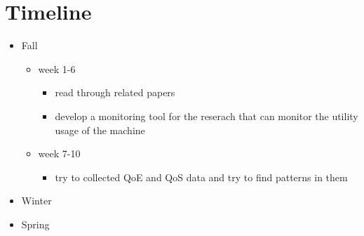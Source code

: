 \section{Timeline}\label{timeline}
\begin{itemize}
    \item Fall
    \begin{itemize}
        \item week 1-6
        \begin{itemize}
            \item read through related papers 
            \item develop a monitoring tool for the reserach that can monitor the utility usage of the machine
        \end{itemize}
        \item week 7-10
        \begin{itemize}
            \item try to collected QoE and QoS data and try to find patterns in them
        \end{itemize}
    \end{itemize}
    \item Winter
    \item Spring
\end{itemize}